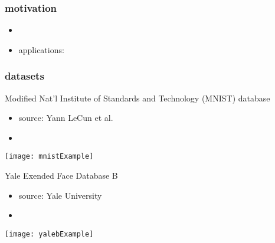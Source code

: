 \begin{frame}
\frametitle{motivation}
	
	\begin{itemize}
		\item 
		\item applications: 
	\end{itemize}

\end{frame}

\begin{frame}
\frametitle{datasets}
	
Modified Nat'l Institute of Standards and Technology (MNIST) database
	\begin{itemize}
		\setlength{\itemindent}{4em}
		\item source: Yann LeCun et al. \cite{lecun-mnisthandwrittendigit-2010}
		\item 
	\end{itemize}

	{
          \begin{center}
	  \texttt{[image: mnistExample]}
          \end{center}
	}

Yale Exended Face Database B
	\begin{itemize}
		\setlength{\itemindent}{4em}
		\item source: Yale University \cite{yaleB}
		\item 
	\end{itemize}

	{
          \begin{center}
	  \texttt{[image: yalebExample]}
          \end{center}
	}

\end{frame}